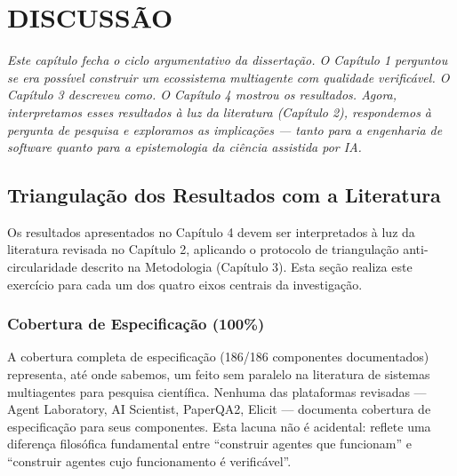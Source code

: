
\chapter{DISCUSSÃO}
\label{ch:discussao}

{\small\itshape Este capítulo fecha o ciclo argumentativo da dissertação. O Capítulo 1 perguntou se era possível construir um ecossistema multiagente com qualidade verificável. O Capítulo 3 descreveu como. O Capítulo 4 mostrou os resultados. Agora, interpretamos esses resultados à luz da literatura (Capítulo 2), respondemos à pergunta de pesquisa e exploramos as implicações — tanto para a engenharia de software quanto para a epistemologia da ciência assistida por IA.}

\section{Triangulação dos Resultados com a Literatura}

Os resultados apresentados no Capítulo 4 devem ser interpretados à luz da literatura revisada no Capítulo 2, aplicando o protocolo de triangulação anti-circularidade descrito na Metodologia (Capítulo 3). Esta seção realiza este exercício para cada um dos quatro eixos centrais da investigação.

\subsection{Cobertura de Especificação (100\%)}

A cobertura completa de especificação (186/186 componentes documentados) representa, até onde sabemos, um feito sem paralelo na literatura de sistemas multiagentes para pesquisa científica. Nenhuma das plataformas revisadas --- Agent Laboratory, AI Scientist, PaperQA2, Elicit --- documenta cobertura de especificação para seus componentes. Esta lacuna não é acidental: reflete uma diferença filosófica fundamental entre ``construir agentes que funcionam'' e ``construir agentes cujo funcionamento é verificável''.


